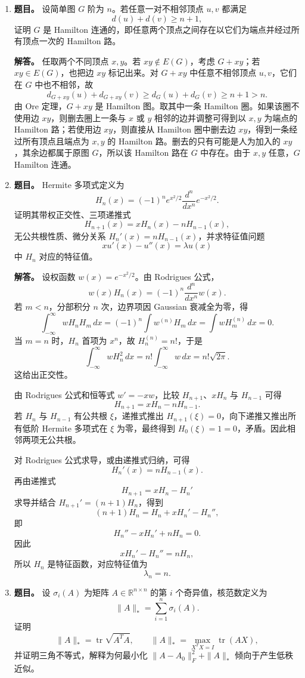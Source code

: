 ﻿\documentclass[UTF8,12pt]{ctexart}
\begin{document}
\begin{enumerate}[label=\textbf{\arabic*.},leftmargin=2.2em]
\item \textbf{题目。} 设简单图 \(G\) 阶为 \(n\)。若任意一对不相邻顶点 \(u,v\) 都满足
\[
d(u)+d(v)\ge n+1,
\]
证明 \(G\) 是 Hamilton 连通的，即任意两个顶点之间存在以它们为端点并经过所有顶点一次的 Hamilton 路。

\textbf{解答。} 任取两个不同顶点 \(x,y\)。若 \(xy\notin E(G)\)，考虑 \(G+xy\)；若 \(xy\in E(G)\)，也把边 \(xy\) 标记出来。对 \(G+xy\) 中任意不相邻顶点 \(u,v\)，它们在 \(G\) 中也不相邻，故
\[
d_{G+xy}(u)+d_{G+xy}(v)\ge d_G(u)+d_G(v)
\ge n+1>n.
\]
由 Ore 定理，\(G+xy\) 是 Hamilton 图。取其中一条 Hamilton 圈。如果该圈不使用边 \(xy\)，则删去圈上一条与 \(x\) 或 \(y\) 相邻的边并调整可得到以 \(x,y\) 为端点的 Hamilton 路；若使用边 \(xy\)，则直接从 Hamilton 圈中删去边 \(xy\)，得到一条经过所有顶点且端点为 \(x,y\) 的 Hamilton 路。删去的只有可能是人为加入的 \(xy\)，其余边都属于原图 \(G\)，所以该 Hamilton 路在 \(G\) 中存在。由于 \(x,y\) 任意，\(G\) Hamilton 连通。

\item \textbf{题目。} Hermite 多项式定义为
\[
H_n(x)=(-1)^n e^{x^2/2}\frac{d^n}{dx^n}e^{-x^2/2}.
\]
证明其带权正交性、三项递推式
\[
H_{n+1}(x)=xH_n(x)-nH_{n-1}(x),
\]
无公共根性质、微分关系 \(H_n'(x)=nH_{n-1}(x)\)，并求特征值问题
\[
xu'(x)-u''(x)=\lambda u(x)
\]
中 \(H_n\) 对应的特征值。

\textbf{解答。} 设权函数 \(w(x)=e^{-x^2/2}\)。由 Rodrigues 公式，
\[
w(x)H_n(x)=(-1)^n\frac{d^n}{dx^n}w(x).
\]
若 \(m<n\)，分部积分 \(n\) 次，边界项因 Gaussian 衰减全为零，得
\[
\int_{-\infty}^{\infty}wH_nH_m\,dx
=(-1)^n\int w^{(n)}H_m\,dx
=\int w H_m^{(n)}\,dx=0.
\]
当 \(m=n\) 时，\(H_n\) 首项为 \(x^n\)，故 \(H_n^{(n)}=n!\)，于是
\[
\int_{-\infty}^{\infty}wH_n^2\,dx=n!\int_{-\infty}^{\infty}w\,dx=n!\sqrt{2\pi}.
\]
这给出正交性。

由 Rodrigues 公式和恒等式 \(w'=-xw\)，比较 \(H_{n+1}\)、\(xH_n\) 与 \(H_{n-1}\) 可得
\[
H_{n+1}=xH_n-nH_{n-1}.
\]
若 \(H_n\) 与 \(H_{n-1}\) 有公共根 \(\xi\)，递推式推出 \(H_{n+1}(\xi)=0\)，向下递推又推出所有低阶 Hermite 多项式在 \(\xi\) 为零，最终得到 \(H_0(\xi)=1=0\)，矛盾。因此相邻两项无公共根。

对 Rodrigues 公式求导，或由递推式归纳，可得
\[
H_n'(x)=nH_{n-1}(x).
\]
再由递推式
\[
H_{n+1}=xH_n-H_n'
\]
求导并结合 \(H_{n+1}'=(n+1)H_n\)，得到
\[
(n+1)H_n=H_n+xH_n'-H_n'',
\]
即
\[
H_n''-xH_n'+nH_n=0.
\]
因此
\[
xH_n'-H_n''=nH_n,
\]
所以 \(H_n\) 是特征函数，对应特征值为
\[
\lambda_n=n.
\]

\item \textbf{题目。} 设 \(\sigma_i(A)\) 为矩阵 \(A\in\mathbb R^{n\times n}\) 的第 \(i\) 个奇异值，核范数定义为
\[
\|A\|_*=
\sum_{i=1}^n\sigma_i(A).
\]
证明
\[
\|A\|_*=\operatorname{tr}\sqrt{A^TA},
\qquad
\|A\|_*=\max_{X^TX=I}\operatorname{tr}(AX),
\]
并证明三角不等式，解释为何最小化 \(\|A-A_0\|_F^2+\|A\|_*\) 倾向于产生低秩近似。


\end{enumerate}
\end{document}
